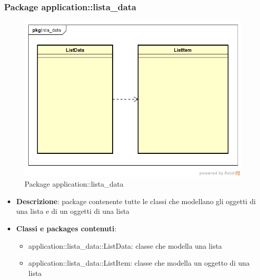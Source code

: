 \subsubsection{Package application::lista\_data}
\label{Package application::lista_data}
\begin{figure}[H]
	\centering
	\includegraphics[scale=0.5]{Sezioni/Packages/Application/lista_data.png}
	\caption{Package application::lista\_data}
\end{figure}
\begin{itemize}
	\item \textbf{Descrizione}: package contenente tutte le classi che modellano gli oggetti di una lista e di un oggetti di una lista
	\item \textbf{Classi e packages contenuti}:
	\begin{itemize}
	\item application::lista\_data::ListData: classe che modella una lista
	\item application::lista\_data::ListItem: classe che modella un oggetto di una lista
	\end{itemize}
\end{itemize}

